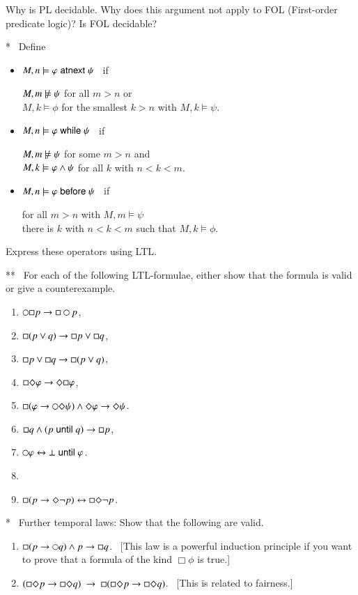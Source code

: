 \begin{question}
  Why is PL decidable. Why does this argument not apply to FOL
  (First-order predicate logic)? Is FOL decidable?
\end{question}


\begin{question}* \
Define 
\begin{itemize}
\item $M,n\models \varphi\mathrel{\mathsf{atnext}}\psi$ \ if \ \
  \parbox{20em}{$M,m\notmodels\psi$ for all $m> n$ or \\
    $M,k\models\phi$ for the smallest $k> n$ with $M,k\models\psi$.}
\item $M,n\models \varphi\mathrel{\mathsf{while}}\psi$ \ if \ \
  \parbox{20em}{$M,m\notmodels\psi$ for some $m > n$ and\\
    $M,k\models\varphi\wedge\psi$ for all $k$ with $n< k< m$.}
\item $M,n\models \varphi\mathrel{\mathsf{before}}\psi$ \ if \ \
  \parbox{20em}{for all $m> n$ with $M,m\models\psi$\\
                there is  $k$ with $n< k< m$ such that $M,k\models\phi$.}
\end{itemize}
Express these operators using LTL.
\end{question}

\begin{question}** \
  For each of the following LTL-formulae, either show that the formula
  is valid or give a counterexample.
\begin{enumerate}
\item $\next\Box p \imp \Box\next p$,
\item $\Box(p\vee q) \rightarrow \Box p \vee \Box q$,
\item $\Box p \vee \Box q \rightarrow \Box(p\vee q)$,
\item $\Box\Diamond\varphi\rightarrow\Diamond\Box\varphi$,
\item $\Box(\phi\imp\next\Diamond\psi) \et \Diamond \phi
  \imp\Diamond\psi$.
\item $\Box q \wedge (p\mathrel{\mathsf{until}} q) \rightarrow \Box p$,
\item $\next\phi \biimp \bot\until\phi$.
\item
\item $\Box(p\rightarrow\Diamond\neg p)\leftrightarrow \Box\Diamond\neg p$.
\end{enumerate}
\end{question}

\begin{question}* \
  Further temporal laws: Show that the following are valid.
\begin{enumerate}
\item $\Box(p\imp \next q) \wedge p \imp \Box q$. \ [This law is a
  powerful induction principle if you want to prove that a formula of
  the kind $\Box\phi$ is true.]
\item $(\Box\Diamond p \imp \Box\Diamond q) \ \imp \ \Box(\Box\Diamond
  p \imp \Box\Diamond q)$. \ [This is related to fairness.]
\end{enumerate}
\end{question}


